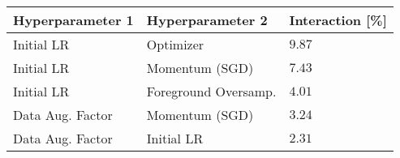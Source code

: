\begin{tabular}{lll}
\toprule
Hyperparameter 1 & Hyperparameter 2 & Interaction [\%] \\
\midrule
Initial LR & Optimizer & $9.87$ \\
Initial LR & Momentum (SGD) & $7.43$ \\
Initial LR & Foreground Oversamp. & $4.01$ \\
Data Aug. Factor & Momentum (SGD) & $3.24$ \\
Data Aug. Factor & Initial LR & $2.31$ \\
\bottomrule
\end{tabular}
